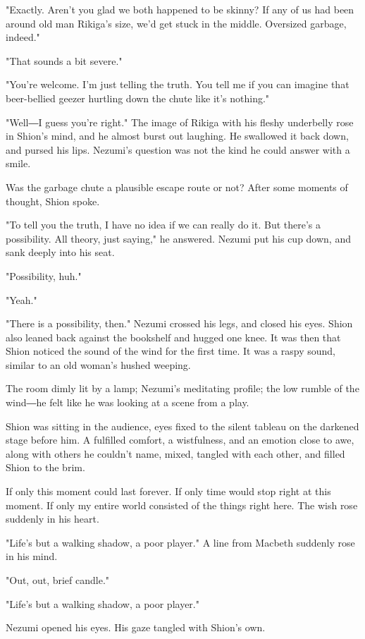 "Exactly. Aren't you glad we both happened to be skinny? If any of us
had been around old man Rikiga's size, we'd get stuck in the middle.
Oversized garbage, indeed."

"That sounds a bit severe."

"You're welcome. I'm just telling the truth. You tell me if you can
imagine that beer-bellied geezer hurtling down the chute like it's
nothing."

"Well―I guess you're right." The image of Rikiga with his fleshy
underbelly rose in Shion's mind, and he almost burst out laughing. He
swallowed it back down, and pursed his lips. Nezumi's question was not
the kind he could answer with a smile.

Was the garbage chute a plausible escape route or not? After some
moments of thought, Shion spoke.

"To tell you the truth, I have no idea if we can really do it. But
there's a possibility. All theory, just saying," he answered. Nezumi put
his cup down, and sank deeply into his seat.

"Possibility, huh."

"Yeah."

"There is a possibility, then." Nezumi crossed his legs, and closed his
eyes. Shion also leaned back against the bookshelf and hugged one knee.
It was then that Shion noticed the sound of the wind for the first time.
It was a raspy sound, similar to an old woman's hushed weeping.

The room dimly lit by a lamp; Nezumi's meditating profile; the low
rumble of the wind―he felt like he was looking at a scene from a play.

Shion was sitting in the audience, eyes fixed to the silent tableau on
the darkened stage before him. A fulfilled comfort, a wistfulness, and
an emotion close to awe, along with others he couldn't name, mixed,
tangled with each other, and filled Shion to the brim.

If only this moment could last forever. If only time would stop right at
this moment. If only my entire world consisted of the things right here.
The wish rose suddenly in his heart.

"Life's but a walking shadow, a poor player." A line from Macbeth
suddenly rose in his mind.

"Out, out, brief candle."

"Life's but a walking shadow, a poor player."

Nezumi opened his eyes. His gaze tangled with Shion's own.

